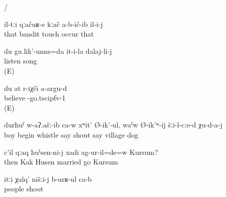 \begin{exe}
	\ex	\label{ex:extended intransitive verbs}
	\begin{xlist}
		\ex	{} 
		\ex	{} 
		\ex	{} 
		\ex	{} 
		\ex	{} 
		\ex	{} 
		\ex	{} 
		\ex	{}\slash{} 
		\ex	{} 
		\ex	{} 
		\ex	{} 
		\ex	{} 
	\end{xlist}

	\ex	\label{ex:The bandits did not touch him}
	\gll	il-tːi	qːačuʁ-e	kːač	a-b-ič-ib	il-i-j\\
		that	bandit	touch	occur	that\\
	\glt	{}

	\ex	\label{ex:I am listening to her/his song}
	\gll	du 	gu.lik'-unne=da 	it-i-la 	dalaj-li-j\\
			listen		song\\
	\glt	{} (E)

	\ex	\label{ex:I (fem.) do not believe (in) you@30a}
	\gll	du	at	r-iχči a-argu-d\\
				believe -go.tsc{ipfv-1}\\
	\glt	{} (E)

	\ex	\label{ex:The boy began to whistle and to cry to the dogs in the village}
	\gll	durħuˁ	w-aʔ.ašː-ib ca-w	xʷit'	Ø-ik'-ul,	waˁw	Ø-ik'ʷ-ij	šːi-l-cːe-d	χu-d-a-j\\
		boy	begin 	whistle	say	shout	say	village	dog\\
	\glt	{}

	\ex	\label{ex:Then did Kursum (fem.) marry Husen (masc.)}
	\gll	c'il	qːaq	ħuˁsen-ni-j	xadi	ag-ur-il=de=w	Kursum?\\
		then	Kak	Husen	married	go	Kursum\\
	\glt	{}

	\ex	\label{ex:‎‎‎The people fought us}
	\gll	itːi	χalq'	nišːi-j	b-urʁ-ul	ca-b\\
			people		shoot	\\
	\glt	{}
\end{exe}

